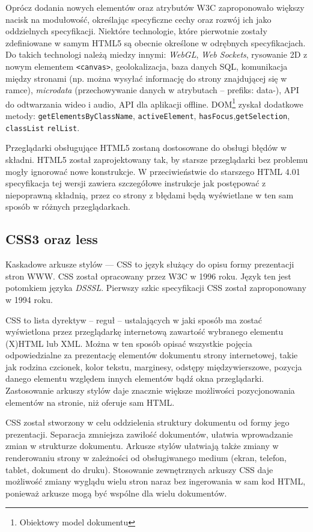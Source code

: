 Oprócz dodania nowych elementów oraz atrybutów W3C zaproponowało większy nacisk na modułowość, określając specyficzne cechy oraz rozwój ich jako oddzielnych specyfikacji. Niektóre technologie, które pierwotnie zostały zdefiniowane w samym HTML5 są obecnie określone w odrębnych specyfikacjach. Do takich technologi należą miedzy innymi: \emph{WebGL}, \emph{Web Sockets}, rysowanie 2D z nowym elementem \verb|<canvas>|, geolokalizacja, baza danych SQL, komunikacja między stronami (np. można wysyłać informację do strony znajdującej się w ramce), \emph{microdata} (przechowywanie danych w atrybutach -- prefiks: data-), API do odtwarzania wideo i audio, API dla aplikacji offline. DOM\footnote{Obiektowy model dokumentu} zyskał dodatkowe metody: \verb|getElementsByClassName|, \verb|activeElement|, \verb|hasFocus|,\verb|getSelection|, \verb|classList| \verb|relList|\cite{htmlWiki}.

Przeglądarki obsługujące HTML5 zostaną dostosowane do obsługi błędów w składni. HTML5 został zaprojektowany tak, by starsze przeglądarki bez problemu mogły ignorować nowe konstrukcje. W przeciwieństwie do starszego HTML 4.01 specyfikacja tej wersji zawiera szczegółowe instrukcje jak postępować z niepoprawną składnią, przez co strony z błędami będą wyświetlane w ten sam sposób w różnych przeglądarkach.

\subsection{CSS3 oraz less}
Kaskadowe arkusze stylów --- CSS to język służący do opisu formy prezentacji stron WWW. CSS został opracowany przez W3C w 1996 roku. Język ten jest potomkiem języka \emph{DSSSL}. Pierwszy szkic specyfikacji CSS został zaproponowany w 1994 roku. 

CSS to lista dyrektyw -- reguł -- ustalających w jaki sposób ma zostać wyświetlona przez przeglądarkę internetową zawartość wybranego elementu (X)HTML lub XML. Można w ten sposób opisać wszystkie pojęcia odpowiedzialne za prezentację elementów dokumentu strony internetowej, takie jak rodzina czcionek, kolor tekstu, marginesy, odstępy międzywierszowe, pozycja danego elementu względem innych elementów bądź okna przeglądarki. Zastosowanie arkuszy stylów daje znacznie większe możliwości pozycjonowania elementów na stronie, niż oferuje sam HTML\cite{cssWiki}. 

CSS został stworzony w celu oddzielenia struktury dokumentu od formy jego prezentacji. Separacja zmniejsza zawiłość dokumentów, ułatwia wprowadzanie zmian w strukturze dokumentu. Arkusze stylów ułatwiają także zmiany w renderowaniu strony w zależności od obsługiwanego medium (ekran, telefon, tablet, dokument do druku). Stosowanie zewnętrznych arkuszy CSS daje możliwość zmiany wyglądu wielu stron naraz bez ingerowania w sam kod HTML, ponieważ arkusze mogą być wspólne dla wielu dokumentów. 

